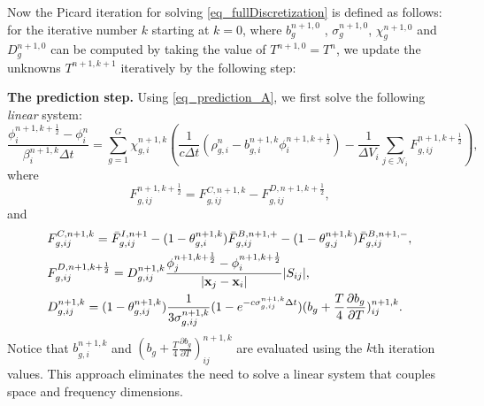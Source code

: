 \documentclass[preprint,12pt]{elsarticle}
\theoremstyle{definition}
\theoremstyle{plain}
\numberwithin{equation}{section}
\numberwithin{algorithm}{section}
\newcounter{eq_count}
\newcounter{subeq_count}
\newcommand{\half}{\frac{1}{2}}
\newcommand{\vr}{\mathbf{x}}
\newcommand{\pdrv}[2]{\frac{\partial{#1}}{\partial{#2}}}
\begin{document}
    Now the Picard iteration for solving \eqref{eq_fullDiscretization}  is defined as follows: for the iterative number $k$ starting at $k =0$, where $b_g^{n+1,0} $ , $\sigma_g^{n+1,0} $, $\chi_g^{n+1,0} $ and $D_g^{n+1,0} $ can be computed by taking the value of $T^{n+1,0} = T^n$, we update the unknowns $T^{n+1,k+1}$ iteratively by the following step:

    	 \textbf{The prediction step.} 
    	Using \eqref{eq_prediction_A}, we first solve the following  \textit{linear} system:
    	\begin{equation} \label{eq_prediction_B}
    		\frac{\phi^{n+1,k+\half}_i - \phi^n_i}{ \beta_i^{n+1,k} \Delta t}=\sum_{g=1}^{G} \chi_{g,i}^{n+1,k} \left( \frac{1}{c \Delta t} \left(\rho_{g,i}^n -  b_{g,i}^{n+1,k} \phi_i^{n+1,k+\half}  \right)
    		-   \frac{1}{\Delta V_i} \sum_{j \in \mathcal{N}_i} 
    		F_{g,ij}^{n+1,k+\half} \right) ,
    	\end{equation}
    	where 
    	\begin{equation*}
    		F_{g,ij}^{n+1,k+\half} = F_{g,ij}^{C,n+1,k} -  F_{g,ij}^{D,n+1,k+\half},
    	\end{equation*}
    	and
    	\begin{subequations}
    		\begin{align*}
    			& F_{g,ij}^{C,n+1,k} = \Bar{F}_{g,ij}^{I,n+1} 
    			- (1 - \theta_{g,i}^{n+1,k}) \Bar{F}_{g,ij}^{B,n+1,+}
    			- (1 - \theta_{g,j}^{n+1,k}) \Bar{F}_{g,ij}^{B,n+1,-},
    			\\
    			&F_{g,ij}^{D,n+1,k+\half} = D_{g,ij}^{n+1,k} \frac{\phi_{j}^{n+1,k+\half} - \phi_i^{n+1,k+\half}}{ |\vr_j - \vr_i| }|S_{ij}|,
    			\\
    			&D_{g,ij}^{n+1,k} =  ( 1 - \theta_{g,ij}^{n+1,k}  ) \frac{1 }{3\sigma_{g,ij}^{n+1,k}}(1-e^{-c \sigma_{g,ij}^{n+1,k}\Delta t}) (b_g + \frac{T}{4} \pdrv{b_g}{T})_{ij}^{n+1,k}.
    		\end{align*}
    	\end{subequations}
    	Notice that $b_{g,i}^{n+1,k}$ and $\left(b_g + \frac{T}{4} \frac{\partial b_g}{\partial T}\right)_{ij}^{n+1,k}$ are evaluated using the $k$th iteration values. This approach eliminates the need to solve a linear system that couples space and frequency dimensions. 
    	
\end{document}

